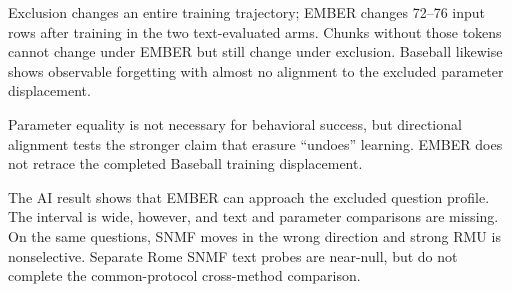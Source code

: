 Exclusion changes an entire training trajectory; EMBER changes 72--76 input
rows after training in the two text-evaluated arms. Chunks without those tokens
cannot change under EMBER but still change under exclusion. Baseball likewise
shows observable forgetting with almost no alignment to the excluded parameter
displacement.

Parameter equality is not necessary for behavioral success, but directional
alignment tests the stronger claim that erasure ``undoes'' learning. EMBER does
not retrace the completed Baseball training displacement.

The AI result shows that EMBER can approach the excluded question profile.
The interval is wide, however, and text and parameter comparisons are missing.
On the same questions, SNMF moves in the wrong direction and strong RMU is
nonselective. Separate Rome SNMF text probes are near-null, but do not complete
the common-protocol cross-method comparison.
